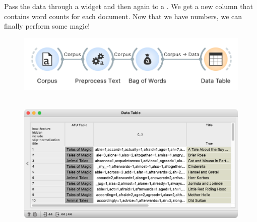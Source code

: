 Pass the data through a  widget and then again to a . We get a new column that contains word counts for each document. Now that we have numbers, we can finally perform some magic!

\vspace{-0.2cm}
\begin{figure}[h]
  \centering
  \includegraphics[width=\linewidth]{workflow.png}%
  \caption{$\;$}
\end{figure}
\vspace{-0.3cm}

\vspace{-0.2cm}
\begin{figure}[h]
  \centering
  \includegraphics[width=1.2\linewidth]{data-table.png}%
  \caption{$\;$}
\end{figure}
\vspace{-0.3cm}